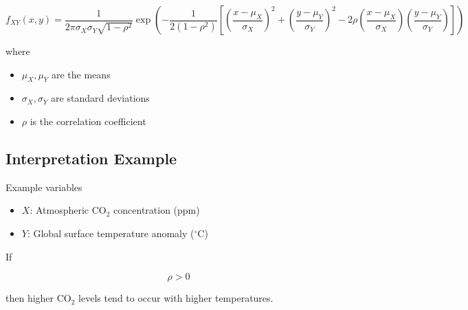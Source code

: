 \documentclass[12pt]{article}
\begin{document}
\[
f_{XY}(x,y)=
\frac{1}{2\pi\sigma_X\sigma_Y\sqrt{1-\rho^2}}
\exp
\left(
-\frac{1}{2(1-\rho^2)}
\left[
\left(\frac{x-\mu_X}{\sigma_X}\right)^2
+
\left(\frac{y-\mu_Y}{\sigma_Y}\right)^2
-
2\rho
\left(\frac{x-\mu_X}{\sigma_X}\right)
\left(\frac{y-\mu_Y}{\sigma_Y}\right)
\right]
\right)
\]

where

\begin{itemize}
\item $\mu_X,\mu_Y$ are the means
\item $\sigma_X,\sigma_Y$ are standard deviations
\item $\rho$ is the correlation coefficient
\end{itemize}

\subsection*{Interpretation Example}

Example variables

\begin{itemize}
\item $X$: Atmospheric CO$_2$ concentration (ppm)
\item $Y$: Global surface temperature anomaly ($^\circ$C)
\end{itemize}

If

\[
\rho>0
\]

then higher CO$_2$ levels tend to occur with higher temperatures.
\end{document}
